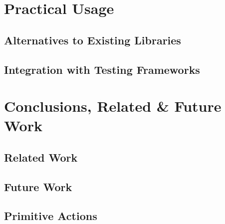 \documentclass[openright, dottedtoc, headinclude, footinclude=true, a4paper, numbers=noenddot, fontsize=10pt]{scrreprt}
\renewcommand*\thesection{\arabic{section}}
\newcommand{\Section}[2]{\section{#2}%
\label{chap:#1}%
}
\newcommand{\Appendix}[2]{\section{#2}%
\label{app:#1}%
}
\begin{document}
\Section{practice}{Practical Usage}
  \subsection{Alternatives to Existing Libraries}
  \label{sec:practice-alternatives}
  

  \subsection{Integration with Testing Frameworks}
  \label{sec:practice-integration}
  

\Section{conclusions}{Conclusions, Related \& Future Work}
  \subsection{Related Work}
  \label{sec:conclusions-related}
  

  \subsection{Future Work}
  \label{sec:conclusions-future}
  

\renewcommand{\thesection}{\Alph{section}}
\begin{appendices}
\Appendix{primops}{Primitive Actions}
\end{appendices}

\if@openright
  \cleardoublepage
\else
  \clearpage
\fi



\end{document}
